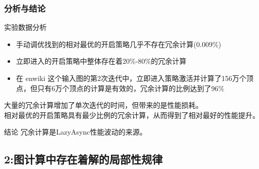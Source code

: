 \documentclass[10pt]{beamer}
\begin{document}
\begin{frame}%
  \frametitle{分析与结论}
  \begin{block}
    {实验数据分析}
    \begin{itemize}
      \item 手动调优找到的相对最优的开启策略几乎不存在冗余计算(0.009\%)
      \item 立即进入的开启策略中整体存在着20\%-80\%的冗余计算
      \item 在 enwiki 这个输入图的第2次迭代中，立即进入策略激活并计算了156万个顶点，但只有6万个顶点的计算是有效的，冗余计算的比例达到了96\%
    \end{itemize}
  \end{block}
  大量的冗余计算增加了单次迭代的时间，但带来的是性能损耗。\\
  相对最优的开启策略具有最少比例的冗余计算，从而得到了相对最好的性能提升。
  \begin{block}
    {结论}
    冗余计算是LazyAsync性能波动的来源。
  \end{block}

\end{frame}

\subsection{2:图计算中存在着解的局部性规律}
\end{document}
